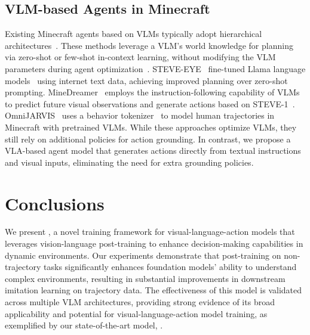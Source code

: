 \subsection{VLM-based Agents in Minecraft}\label{app:vlm_agents_minecraft}
Existing Minecraft agents based on VLMs typically adopt hierarchical architectures~\citep{deps,minedreamer,minedojo,deng2025open,zhao2024optimizing,cai2023open}. These methods leverage a VLM’s world knowledge for planning via zero-shot or few-shot in-context learning, without modifying the VLM parameters during agent optimization~\citep{deps,jarvis1,voyager,li2024optimus}.
STEVE-EYE~\citep{zheng2023steve} fine-tuned Llama language models~\citep{llama} using internet text data, achieving improved planning over zero-shot prompting. MineDreamer~\citep{minedreamer} employs the instruction-following capability of VLMs to predict future visual observations and generate actions based on STEVE-1~\citep{steve1}. OmniJARVIS~\citep{omnijarvis} uses a behavior tokenizer~\citep{groot,groot2} to model human trajectories in Minecraft with pretrained VLMs.
While these approaches optimize VLMs, they still rely on additional policies for action grounding. In contrast, we propose a VLA-based agent model that generates actions directly from textual instructions and visual inputs, eliminating the need for extra grounding policies.

\section{Conclusions}
We present \method, a novel training framework for visual-language-action models that leverages vision-language post-training to enhance decision-making capabilities in dynamic environments. Our experiments demonstrate that post-training on non-trajectory tasks significantly enhances foundation models’ ability to understand complex environments, resulting in substantial improvements in downstream imitation learning on trajectory data. The effectiveness of this model is validated across multiple VLM architectures, providing strong evidence of its broad applicability and potential for visual-language-action model training, as exemplified by our state-of-the-art model, \model.
